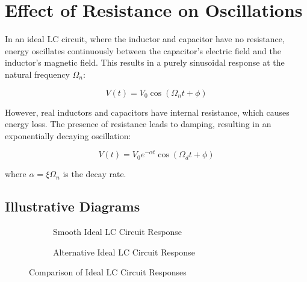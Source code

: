 \documentclass[a4paper,12pt]{article}
\begin{document}
\section{Effect of Resistance on Oscillations}

In an ideal LC circuit, where the inductor and capacitor have no resistance, energy oscillates continuously between the capacitor's electric field and the inductor's magnetic field. This results in a purely sinusoidal response at the natural frequency \(\Omega_n\):

\[
V(t) = V_0 \cos(\Omega_n t + \phi)
\]

However, real inductors and capacitors have internal resistance, which causes energy loss. The presence of resistance leads to damping, resulting in an exponentially decaying oscillation:

\[
V(t) = V_0 e^{-\alpha t} \cos(\Omega_d t + \phi)
\]

where \(\alpha = \xi \Omega_n\) is the decay rate.

\subsection{Illustrative Diagrams}

\begin{figure}[H]
    \centering
    \begin{subfigure}{0.45\textwidth}
        \centering
        \caption{Smooth Ideal LC Circuit Response}
    \end{subfigure}
    \hfill
    \begin{subfigure}{0.45\textwidth}
        \centering
        \caption{Alternative Ideal LC Circuit Response}
    \end{subfigure}
    \caption{Comparison of Ideal LC Circuit Responses}
\end{figure}
\end{document}
